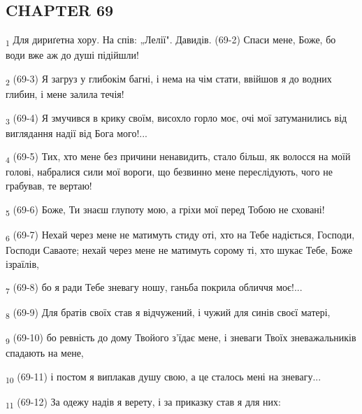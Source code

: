 \subsection{CHAPTER 69}
\begin{tcolorbox}
\textsubscript{1} Для дириґетна хору. На спів: „Лелії". Давидів. (69-2) Спаси мене, Боже, бо води вже аж до душі підійшли!
\end{tcolorbox}
\begin{tcolorbox}
\textsubscript{2} (69-3) Я загруз у глибокім багні, і нема на чім стати, ввійшов я до водних глибин, і мене залила течія!
\end{tcolorbox}
\begin{tcolorbox}
\textsubscript{3} (69-4) Я змучився в крику своїм, висохло горло моє, очі мої затуманились від виглядання надії від Бога мого!...
\end{tcolorbox}
\begin{tcolorbox}
\textsubscript{4} (69-5) Тих, хто мене без причини ненавидить, стало більш, як волосся на моїй голові, набралися сили мої вороги, що безвинно мене переслідують, чого не грабував, те вертаю!
\end{tcolorbox}
\begin{tcolorbox}
\textsubscript{5} (69-6) Боже, Ти знаєш глупоту мою, а гріхи мої перед Тобою не сховані!
\end{tcolorbox}
\begin{tcolorbox}
\textsubscript{6} (69-7) Нехай через мене не матимуть стиду оті, хто на Тебе надіється, Господи, Господи Саваоте; нехай через мене не матимуть сорому ті, хто шукає Тебе, Боже ізраїлів,
\end{tcolorbox}
\begin{tcolorbox}
\textsubscript{7} (69-8) бо я ради Тебе зневагу ношу, ганьба покрила обличчя моє!...
\end{tcolorbox}
\begin{tcolorbox}
\textsubscript{8} (69-9) Для братів своїх став я відчужений, і чужий для синів своєї матері,
\end{tcolorbox}
\begin{tcolorbox}
\textsubscript{9} (69-10) бо ревність до дому Твойого з'їдає мене, і зневаги Твоїх зневажальників спадають на мене,
\end{tcolorbox}
\begin{tcolorbox}
\textsubscript{10} (69-11) і постом я виплакав душу свою, а це сталось мені на зневагу...
\end{tcolorbox}
\begin{tcolorbox}
\textsubscript{11} (69-12) За одежу надів я верету, і за приказку став я для них:
\end{tcolorbox}
